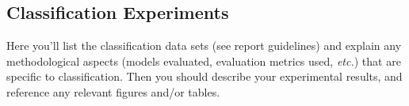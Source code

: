 \subsection{Classification Experiments}

Here you'll list the classification data sets (see report guidelines) and explain any methodological
aspects (models evaluated, evaluation metrics used, {\em etc.}) that are specific to classification.
Then you should describe your experimental results,
and reference any relevant figures and/or tables.